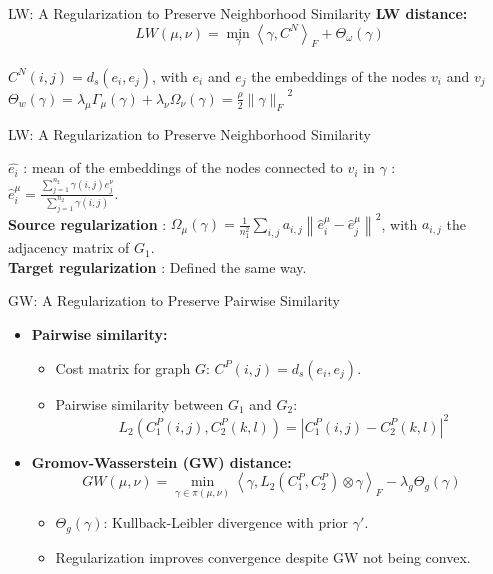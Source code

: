 \documentclass[french]{beamer}
\begin{document}
\begin{frame}{LW: A Regularization to Preserve Neighborhood Similarity}
        \textbf{LW distance:}
        \[
        LW(\mu, \nu) = \underset{\gamma}{\operatorname{min}} \left\langle \gamma , C^N \right\rangle_F + \Theta_\omega(\gamma) 
        \]\\
$ C^N(i,j) = d_s(e_i, e_j)$, with $e_i$ and $e_j$ the embeddings of the nodes $v_i$ and $v_j$\\[0.3cm]
$ \Theta_w(\gamma) = \lambda_\mu \Gamma_\mu(\gamma) + \lambda_\nu \Omega_\nu(\gamma) = \frac{\rho}{2}{ \lVert \gamma\rVert _F}^2$
\end{frame}

\begin{frame}{LW: A Regularization to Preserve Neighborhood Similarity}

    $\hat{e_i}$ : mean of the embeddings of the nodes connected to $v_i$ in $\gamma$ : \\[0.3cm]
$ \hat{e}_i^\mu = \frac{\sum_{j=1}^{n_2} \gamma(i,j)e_j^{\nu}}{\sum_{j=1}^{n_2} \gamma(i,j)}$. \\[0.3cm]

\textbf{Source regularization} : $\Omega_\mu(\gamma) = \frac{1}{n_1^2} \sum_{i,j} a_{i,j} \left\lVert \hat{e}_i^\mu - \hat{e}_j^\mu\right\rVert ^2 $, with $a_{i,j}$ the adjacency matrix of $G_1$.\\[0.3cm]
\textbf{Target regularization} : Defined the same way. 


\end{frame}
\begin{frame}{GW: A Regularization to Preserve Pairwise Similarity}
    \begin{itemize}
        \item \textbf{Pairwise similarity:}
        \begin{itemize}
            \item Cost matrix for graph \( G \): \( C^P(i,j) = d_s(e_i, e_j) \).
            \item Pairwise similarity between \( G_1 \) and \( G_2 \):  
            \[
            L_2(C_1^P(i,j), C_2^P(k,l)) = \left\lvert C_1^P(i,j) - C_2^P(k,l) \right\rvert^2
            \]
        \end{itemize}

        \item \textbf{Gromov-Wasserstein (GW) distance:}
        \[
        GW(\mu, \nu) = \underset{\gamma \in \pi(\mu, \nu)}{\operatorname{min}} \left\langle \gamma, L_2(C_1^P, C_2^P) \otimes \gamma \right\rangle_F - \lambda_g \Theta_g(\gamma)
        \]
        \begin{itemize}
            \item \(\Theta_g(\gamma)\): Kullback-Leibler divergence with prior \( \gamma' \).
            \item Regularization improves convergence despite GW not being convex.
        \end{itemize}

    \end{itemize}
\end{frame}
\end{document}
